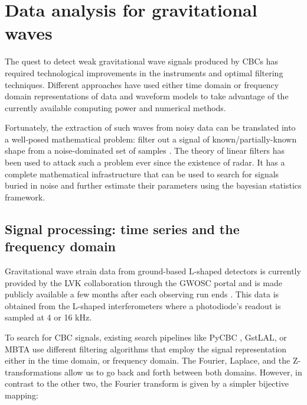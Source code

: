 \chapter{Data analysis for gravitational waves}\label{DA}

The quest to detect weak gravitational wave signals produced by CBCs has required technological improvements in the instruments and optimal filtering techniques. Different approaches have used either time domain or frequency domain representations of data and waveform models to take advantage of the currently available computing power and numerical methods.

Fortunately, the extraction of such waves from noisy data can be translated into a well-posed mathematical problem: filter out a signal of known/partially-known shape from a noise-dominated set of samples \cite{Maggiore:2007ulw, Creighton:2011zz, Sathyaprakash:2009xs}. The theory of linear filters has been used to attack such a problem ever since the existence of radar\cite{Wainstein:1962vrq}. It has a complete mathematical infrastructure that can be used to search for signals buried in noise and further estimate their parameters using the bayesian statistics framework.



\section{Signal processing: time series and the frequency domain}

Gravitational wave strain data from ground-based L-shaped detectors is currently provided by the LVK collaboration through the GWOSC portal and is made publicly available a few months after each observing run ends \cite[section-3]{LIGOScientific:2019lzm}. This data is obtained from the L-shaped interferometers where a photodiode's readout is sampled at 4 or 16 kHz.



To search for CBC signals, existing search pipelines like PyCBC \cite{Usman:2015kfa}, GstLAL\cite{Sachdev:2019vvd}, or MBTA\cite{Aubin:2020goo} use different filtering algorithms that employ the signal representation either in the time domain, or frequency domain. The Fourier, Laplace, and the Z-transformations allow us to go back and forth between both domains. However, in contrast to the other two, the Fourier transform is given by a simpler bijective mapping:

